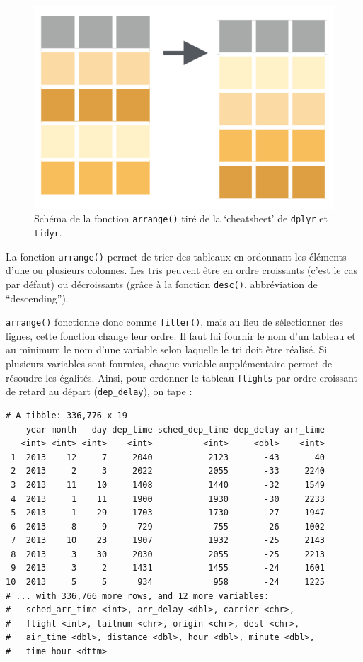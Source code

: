 \documentclass[
  a4paper,
]{article}
\newenvironment{Shaded}{\begin{snugshade}}{\end{snugshade}}
\newcommand{\KeywordTok}[1]{\textcolor[rgb]{0.12,0.11,0.11}{\textbf{#1}}}
\newcommand{\NormalTok}[1]{\textcolor[rgb]{0.12,0.11,0.11}{#1}}
\newcommand{\OperatorTok}[1]{\textcolor[rgb]{0.12,0.11,0.11}{#1}}
\newcommand{\StringTok}[1]{\textcolor[rgb]{0.75,0.01,0.01}{#1}}
\begin{document}
\begin{figure}[htpb]

{\centering \includegraphics[width=0.4\linewidth]{images/arrange} 

}

\caption{Schéma de la fonction \texttt{arrange()} tiré de la `cheatsheet' de \texttt{dplyr} et \texttt{tidyr}.}\label{fig:arrangefig}
\end{figure}



La fonction \texttt{arrange()} permet de trier des tableaux en ordonnant les éléments d'une ou plusieurs colonnes. Les tris peuvent être en ordre croissants (c'est le cas par défaut) ou décroissants (grâce à la fonction \texttt{desc()}, abbréviation de ``descending'').

\texttt{arrange()} fonctionne donc comme \texttt{filter()}, mais au lieu de sélectionner des lignes, cette fonction change leur ordre. Il faut lui fournir le nom d'un tableau et au minimum le nom d'une variable selon laquelle le tri doit être réalisé. Si plusieurs variables sont fournies, chaque variable supplémentaire permet de résoudre les égalités. Ainsi, pour ordonner le tableau \texttt{flights} par ordre croissant de retard au départ (\texttt{dep\_delay}), on tape :

\begin{Shaded}
\end{Shaded}

\begin{verbatim}
# A tibble: 336,776 x 19
    year month   day dep_time sched_dep_time dep_delay arr_time
   <int> <int> <int>    <int>          <int>     <dbl>    <int>
 1  2013    12     7     2040           2123       -43       40
 2  2013     2     3     2022           2055       -33     2240
 3  2013    11    10     1408           1440       -32     1549
 4  2013     1    11     1900           1930       -30     2233
 5  2013     1    29     1703           1730       -27     1947
 6  2013     8     9      729            755       -26     1002
 7  2013    10    23     1907           1932       -25     2143
 8  2013     3    30     2030           2055       -25     2213
 9  2013     3     2     1431           1455       -24     1601
10  2013     5     5      934            958       -24     1225
# ... with 336,766 more rows, and 12 more variables:
#   sched_arr_time <int>, arr_delay <dbl>, carrier <chr>,
#   flight <int>, tailnum <chr>, origin <chr>, dest <chr>,
#   air_time <dbl>, distance <dbl>, hour <dbl>, minute <dbl>,
#   time_hour <dttm>
\end{verbatim}
\end{document}
